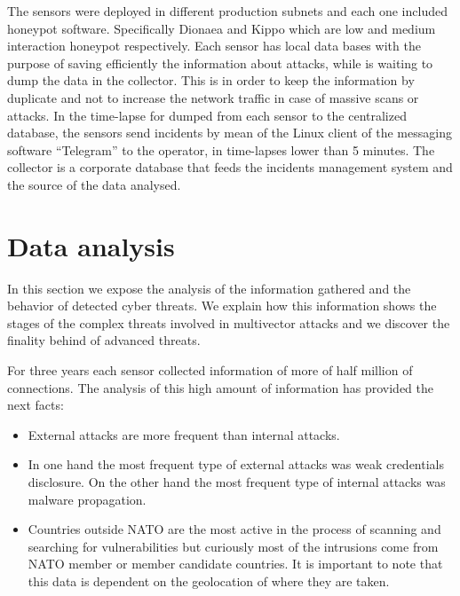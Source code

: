 \documentclass[a4paper]{llncs}
\begin{document}
The sensors were deployed in different production subnets and each one included honeypot software. Specifically Dionaea\cite{dionaea} and Kippo\cite{kippo} which are low and medium interaction honeypot respectively. Each sensor has local data bases with the purpose of saving efficiently the information about attacks, while is waiting to dump the data in the collector. This is  in order to keep the information by duplicate and not to increase the network traffic in case of massive scans or attacks. In the time-lapse for dumped from each sensor to the centralized database, the sensors send incidents by mean of the Linux client of the messaging software ``Telegram'' to the operator, in time-lapses lower than 5 minutes. The collector is a corporate database that feeds the incidents management system and the source of the data analysed.
	
	
\section{Data analysis}
\label{sec:analysis}
In this section we expose the analysis of the information gathered and the behavior of detected cyber threats. We explain how this information shows the stages of the complex threats involved in multivector attacks and we discover the finality behind of advanced threats.

For three years each sensor collected information of more of half million of connections. The analysis of this high amount of information has provided the next facts:
\begin{itemize}
	\item External attacks are more frequent than internal attacks.
	\item In one hand the most frequent type of external attacks was weak credentials disclosure. On the other hand the most frequent type of internal attacks was malware propagation.
	\item Countries outside NATO are the most active in the process of scanning and searching for vulnerabilities but curiously most of the intrusions come from NATO member or member candidate countries. It is important to note that this data is dependent on the geolocation of where they are taken.
\end{itemize}
\end{document}
